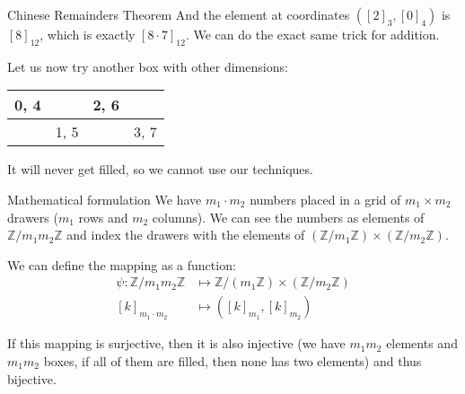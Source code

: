 \documentclass[a4paper]{article}
\begin{document}
\begin{parag}{Chinese Remainders Theorem}
    And the element at coordinates $\left(\left[2\right]_3, \left[0\right]_4\right)$ is $\left[8\right]_{12}$, which is exactly $\left[8\cdot 7\right]_{12}$. We can do the exact same trick for addition.

    Let us now try another box with other dimensions:
    \begin{center}
    \begin{tabular}{|c|c|c|c|}
        \hline
        0, 4 & & 2, 6 & \\
        \hline
             & 1, 5  & & 3, 7 \\
        \hline

    \end{tabular}
    \end{center}

    It will never get filled, so we cannot use our techniques.

    \begin{subparag}{Mathematical formulation}
        We have $m_1 \cdot m_2$ numbers placed in a grid of $m_1 \times m_2$ drawers ($m_1$ rows and $m_2$ columns). We can see the numbers as elements of $\mathbb{Z} / m_1 m_2 \mathbb{Z}$ and index the drawers with the elements of $\left(\mathbb{Z} / m_1 \mathbb{Z}\right) \times \left(\mathbb{Z} / m_2 \mathbb{Z}\right)$.

        We can define the mapping as a function:
        \[\begin{split}
            \psi: \mathbb{Z} / m_1 m_2 \mathbb{Z} &\longmapsto \mathbb{Z} / \left(m_1 \mathbb{Z}\right) \times \left(\mathbb{Z} / m_2\mathbb{Z}\right) \\
            \left[k\right]_{m_1 \cdot m_2} &\longmapsto \left(\left[k\right]_{m_1}, \left[k\right]_{m_2}\right)
        \end{split}\]

        If this mapping is surjective, then it is also injective (we have $m_1 m_2$ elements and $m_1 m_2$ boxes, if all of them are filled, then none has two elements) and thus bijective.
    \end{subparag}
\end{parag}
\end{document}
